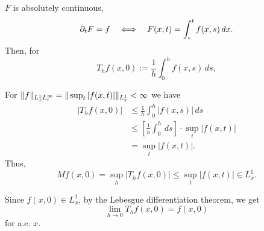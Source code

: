 \documentclass{../exp}
\begin{document}
$F$ is absolutely continuous,
\[\pd_tF=f\iff F(x,t)=\int_c^tf(x,s)\,dx.\]
Then, for
\[T_hf(x,0):=\frac1h\int_0^hf(x,s)\,ds,\]

For $\|f\|_{L_x^1L_t^\infty}=\|\sup_t|f(x,t)|\|_{L_x^1}<\infty$
we have
\begin{align*}
|T_hf(x,0)|&\le\frac1h\int_0^h|f(x,s)|\,ds\\
&\le\left[\frac1h\int_0^h\,ds\right]\cdot\sup_t|f(x,t)|\\
&=\sup_t|f(x,t)|.
\end{align*}
Thus,
\[Mf(x,0)=\sup_h|T_hf(x,0)|\le\sup_t|f(x,t)|\in L_x^1.\]

Since $f(x,0)\in L_x^1$, by the Lebesgue differentiation theorem, we get
\[\lim_{h\to0}T_hf(x,0)=f(x,0)\]
for a.e. $x$.
\end{document}
